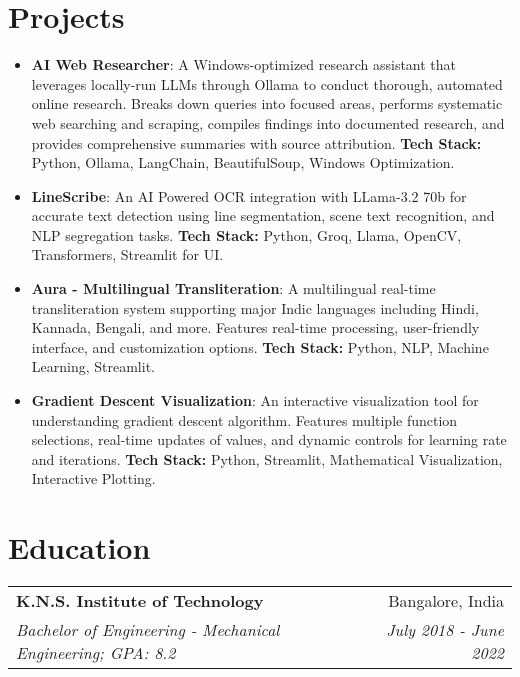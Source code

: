 \documentclass[a4paper,20pt]{article}
\makeatletter
\newcommand{\resumeItem}[2]{
  \item\small{
    \textbf{#1}{: #2 \vspace{-2pt}}
  }
}
\newcommand{\resumeCompanyHeading}[4]{
  \vspace{5pt}
    \begin{tabular*}{0.97\textwidth}{l@{\extracolsep{\fill}}r}
      \textbf{#1} & #2 \\
      \textit{#3} & \textit{#4} \\
    \end{tabular*}\vspace{-5pt}
}
\newcommand{\resumeSubItem}[2]{\resumeItem{#1}{#2}\vspace{-3pt}}
\newcommand{\resumeSubHeadingListStart}{\begin{itemize}[leftmargin=*]}
\newcommand{\resumeSubHeadingListEnd}{\end{itemize}}
\makeatother
\begin{document}
\section{Projects}
\resumeSubHeadingListStart
\resumeSubItem{AI Web Researcher}{A Windows-optimized research assistant that leverages locally-run LLMs through Ollama to conduct thorough, automated online research. Breaks down queries into focused areas, performs systematic web searching and scraping, compiles findings into documented research, and provides comprehensive summaries with source attribution. \textbf{Tech Stack:} Python, Ollama, LangChain, BeautifulSoup, Windows Optimization.}
\vspace{5pt}
\resumeSubItem{LineScribe}{An AI Powered OCR integration with LLama-3.2 70b for accurate text detection using line segmentation, scene text recognition, and NLP segregation tasks. \textbf{Tech Stack:} Python, Groq, Llama, OpenCV, Transformers, Streamlit for UI.}
\vspace{5pt}
\resumeSubItem{Aura - Multilingual Transliteration}{A multilingual real-time transliteration system supporting major Indic languages including Hindi, Kannada, Bengali, and more. Features real-time processing, user-friendly interface, and customization options. \textbf{Tech Stack:} Python, NLP, Machine Learning, Streamlit.}
\vspace{5pt}
\resumeSubItem{Gradient Descent Visualization}{An interactive visualization tool for understanding gradient descent algorithm. Features multiple function selections, real-time updates of values, and dynamic controls for learning rate and iterations. \textbf{Tech Stack:} Python, Streamlit, Mathematical Visualization, Interactive Plotting.}
\resumeSubHeadingListEnd

\vspace{-5pt}
\section{Education}
  \resumeCompanyHeading
    {K.N.S. Institute of Technology}{Bangalore, India}
    {Bachelor of Engineering - Mechanical Engineering;  GPA: 8.2}{July 2018 - June 2022}

\vspace{5pt}
\end{document}
